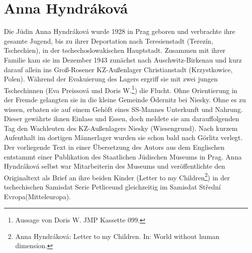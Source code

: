 \section*{Anna Hyndr\'akov\'a}
Die Jüdin Anna Hyndr\'akov\'a wurde 1928 in Prag geboren und verbrachte ihre gesamte Jugend, bis zu ihrer Deportation nach Teresienstadt (Terez\'in, Tschechien), in der tschechoslowakischen Hauptstadt. Zusammen mit ihrer Familie kam sie im Dezember 1943 zunächst nach Auschwitz-Birkenau und kurz darauf allein ins Groß-Rosener KZ-Außenlager Christianstadt (Krzystkowice, Polen). Während der Evakuierung des Lagers ergriff sie mit zwei jungen Tschechinnen (Eva Preissov\'a und Doris W.\footnote{Aussage von Doris W. JMP Kassette 099.}) die Flucht. Ohne Orientierung in der Fremde gelangten sie in die kleine Gemeinde Ödernitz bei Niesky. Ohne es zu wissen, erbaten sie auf einem Gehöft eines SS-Mannes Unterkunft und Nahrung. Dieser gewährte ihnen Einlass und Essen, doch meldete sie am darauffolgenden Tag den Wachleuten des KZ-Außenlagers Niesky (Wiesengrund). Nach kurzem Aufenthalt im dortigen Männerlager wurden sie schon bald nach Görlitz verlegt. Der vorliegende Text in einer Übersetzung des Autors aus dem Englischen entstammt einer Publikation des Staatlichen Jüdischen Museums in Prag. Anna Hyndr\'akov\'a selbst war Mitarbeiterin des Museums und veröffentlichte den Originaltext als Brief an ihre beiden Kinder (\glqq Letter to my Children\grqq\footnote{Anna Hyndr\'akov\'a: Letter to my Children. In: World without human dimension.}) in der tschechischen Samisdat Serie \glqq Petlice\grqq und gleichzeitig im Samisdat \glqq Středn\'i Evropa\grqq (Mitteleuropa).

